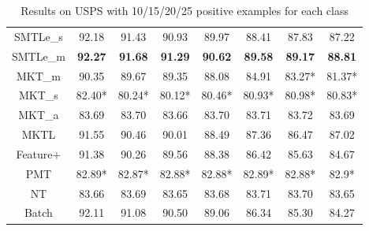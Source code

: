 \begin{table*}
{{\begin{tabular}{|c|c|c|c|c|c|c|c|}
      SMTLe\_s & 92.18 & 91.43 & 90.93 & 89.97 & 88.41 & 87.83 & 87.22\\ 
      SMTLe\_m & \textbf{92.27} & \textbf{91.68} & \textbf{91.29} & \textbf{90.62} & \textbf{89.58} & \textbf{89.17} & \textbf{88.81}\\ 
      MKT\_{m} & 90.35 & 89.67 & 89.35 & 88.08 & 84.91 & 83.27* & 81.37*\\ 
      MKT\_{s} & 82.40* & 80.24* & 80.12* & 80.46* & 80.93* & 80.98* & 80.83*\\ 
      MKT\_{a} & 83.69 & 83.70 & 83.66 & 83.70 & 83.71 & 83.72 & 83.69\\ 
      MKTL & 91.55 & 90.46 & 90.01 & 88.49 & 87.36 & 86.47 & 87.02\\ 
      Feature+ & 91.38 & 90.26 & 89.56 & 88.38 & 86.42 & 85.63 & 84.67\\ 
      PMT & 82.89* & 82.87* & 82.88* & 82.88* & 82.89* & 82.88* & 82.9*\\ 
      NT & 83.66 & 83.69 & 83.65 & 83.68 & 83.71 & 83.70 & 83.65\\ 
      Batch & 92.11 & 91.08 & 90.50 & 89.06 & 86.34 & 85.30 & 84.27\\ 
\hline\end{tabular}}}\caption{Results on USPS with 10/15/20/25 positive examples for each class} \label{tab:usps}
\end{table*}